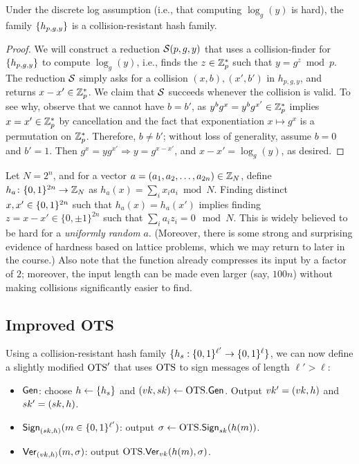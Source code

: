 \documentclass[11pt]{article}
\begin{document}
\begin{claim}
  Under the discrete log assumption (i.e., that computing
  $\log_{g}(y)$ is hard), the family $\{h_{p,g,y}\}$ is a
  collision-resistant hash family.
\end{claim}

\begin{proof}
  We will construct a reduction $\mathcal{S}(p,g,y)$ that uses a
  collision-finder for $\{h_{p,g,y}\}$ to compute $\log_{g}(y)$,
  i.e., finds the $z \in \mathbb{Z}_p^{*}$ such that $y = g^z \bmod p$.  The
  reduction $\mathcal{S}$ simply asks for a collision $(x,b), (x',b')$ in
  $h_{p,g,y}$, and returns $x-x' \in \mathbb{Z}_p^{*}$.  We claim that $\mathcal{S}$
  succeeds whenever the collision is valid.  To see why, observe that
  we cannot have $b = b'$, as $y^b g^x = y^{b} g^{x'} \in \mathbb{Z}_p^{*}$
  implies $x = x' \in \mathbb{Z}_p^{*}$ by cancellation and the fact that
  exponentiation $x \mapsto g^{x}$ is a permutation on $\mathbb{Z}_p^{*}$.
  Therefore, $b \neq b'$; without loss of generality, assume $b = 0$
  and $b' = 1$.  Then $g^x = y g^{x'} \Rightarrow y = g^{x - x'}$, and
  $x-x' = \log_{g}(y)$, as desired.
\end{proof}

\begin{example}
  Let $N= 2^{n}$, and for a vector $a=(a_1,a_2,\ldots, a_{2n}) \in
  \mathbb{Z}_N$, define $h_a \colon \{0,1\}^{2n} \to \mathbb{Z}_N$ as $h_a(x) = \sum_i
  x_i a_i \bmod N$.  Finding distinct $x,x' \in \{0,1\}^{2n}$ such that
  $h_{a}(x) = h_{a}(x')$ implies finding $z = x-x' \in \{0, \pm 1
  \}^{2n}$ such that $\sum_i a_i z_i = 0 \mod N$.  This is widely
  believed to be hard for a \emph{uniformly random} $a$.  (Moreover,
  there is some strong and surprising evidence of hardness based on
  lattice problems, which we may return to later in the course.)  Also
  note that the function already compresses its input by a factor of
  $2$; moreover, the input length can be made even larger (say,
  $100n$) without making collisions significantly easier to find.
\end{example}

\subsection{Improved OTS}

Using a collision-resistant hash family $\{h_{s} : \{0,1\}^{\ell'} \to
  \{0,1\}^{\ell}\}$, we can now define a slightly modified $\text{OTS}'$ that
uses $\text{OTS}$ to sign messages of length $\ell' > \ell$:

\begin{itemize}
\item $\mathsf{Gen}$: choose $h \gets \{h_s\}$ and $(vk,sk) \gets
  \text{OTS}.\mathsf{Gen}$.  Output $vk' = (vk, h)$ and $sk' = (sk,h)$.
\item $\mathsf{Sign}_{(sk,h)}(m \in \{0,1\}^{\ell'})$: output $\sigma \gets
  \text{OTS}.\mathsf{Sign}_{sk}(h(m))$.
\item $\mathsf{Ver}_{(vk,h)}(m,\sigma)$: output
  $\text{OTS}.\mathsf{Ver}_{vk}(h(m),\sigma)$.
\end{itemize}
\end{document}
